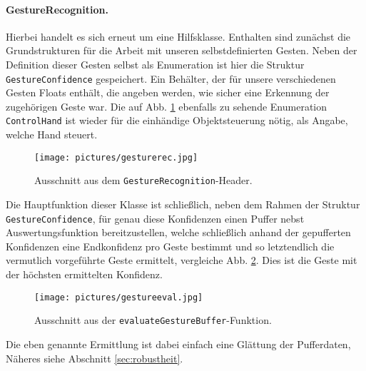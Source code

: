 	\paragraph{GestureRecognition.} Hierbei handelt es sich erneut um eine Hilfsklasse. Enthalten sind zunächst die Grundstrukturen für die Arbeit mit unseren selbstdefinierten Gesten. Neben der Definition dieser Gesten selbst als Enumeration ist hier die Struktur \glqq \texttt{GestureConfidence}\grqq{} gespeichert. Ein Behälter, der für unsere verschiedenen Gesten Floats enthält, die angeben werden, wie sicher eine Erkennung der zugehörigen Geste war. Die auf Abb. \ref{fig:gestrechead} ebenfalls zu sehende Enumeration \texttt{ControlHand} ist wieder für die einhändige Objektsteuerung nötig, als Angabe, welche Hand steuert.\par
	\begin{figure}[h]
	\centering
	\texttt{[image: pictures/gesturerec.jpg]}
	\caption{Ausschnitt aus dem \texttt{GestureRecognition}-Header.}\label{fig:gestrechead}
	\end{figure}	
	Die Hauptfunktion dieser Klasse ist schließlich, neben dem Rahmen der Struktur \texttt{GestureConfidence}, für genau diese Konfidenzen einen Puffer nebst Auswertungsfunktion bereitzustellen, welche schließlich anhand der gepufferten Konfidenzen eine Endkonfidenz pro Geste bestimmt und so letztendlich die vermutlich vorgeführte Geste ermittelt, vergleiche Abb. \ref{fig:evalgestbuf}. Dies ist die Geste mit der höchsten ermittelten Konfidenz.
	\begin{figure}
	\centering
	\texttt{[image: pictures/gestureeval.jpg]}
	\caption{Ausschnitt aus der \texttt{evaluateGestureBuffer}-Funktion.}\label{fig:evalgestbuf}
	\end{figure}
	Die eben genannte \glqq Ermittlung\grqq{} ist dabei einfach eine Glättung der Pufferdaten, Näheres siehe Abschnitt \ref{sec:robustheit}.\par\medskip
